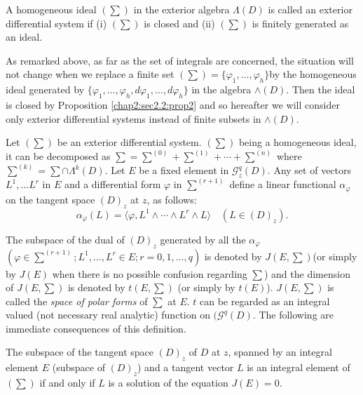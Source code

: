 \begin{defi*}%
  A homogeneous ideal $(\sum)$ in the exterior algebra $\Lambda(D)$ is
  called an exterior differential system if (i) $(\sum)$ is closed
  and (ii)  $(\sum)$ is finitely generated as an ideal. 
\end{defi*}

As remarked above,  as far as the set of integrals are concerned,  the
situation will not change when we replace a finite set  $(\sum) = \{
\varphi_1, \ldots,  \varphi_h\}$\pageoriginale by the homogeneous ideal generated by
$\{ \varphi_1,  \ldots,  \varphi_h,  d \varphi_1,  \ldots,  d
\varphi_h\}$ in the algebra $\wedge (D)$. Then the ideal is closed by
Proposition \ref{chap2:sec2.2:prop2} and so hereafter we will consider
only exterior 
differential systems instead of finite subsets in $\wedge (D)$. 

Let $(\sum)$ be an exterior differential system. $(\sum)$ being a
homogeneous ideal,  it can be decomposed as $\sum = \sum^{(0)} +
\sum^{(1)} + \cdots + \sum^{(n)}$ where $\sum^{(k)} = \sum \cap
\Lambda^k (D)$. Let $E$ be a fixed element in $\mathscr{G} ^{q}_z
(D)$. Any set of vectors $L^1,  \ldots L^r$ in $E$ and a differential
form $\varphi$ in $\sum^{(r +1)}$ define a linear functional
$\alpha_\varphi$ on the tangent space $(D)_z$ at $z$,  as follows: 
$$
\alpha_\varphi (L) = \langle \varphi,  L^1 \wedge \cdots \wedge L^r
\wedge L \rangle \quad (L \in (D)_z). 
$$

The subspace of the dual of $(D)_z$ generated by all the
$\alpha_\varphi$ \break $\left(\varphi \in \sum^{(r+1)}; L^1,  \ldots,
L^r  \in E; 
r = 0,  1,  \ldots,  q\right)$ is denoted by $J(E,  \sum)$\break (or simply by
$J(E)$ when there is no possible confusion regarding $\sum$) and the
dimension of $J(E,  \sum)$ is denoted by $t(E,  \sum)$ (or simply by
$t(E)$). $J(E,  \sum)$ is called the \textit{space of polar forms} of
$\sum$ at $E$. $t$ can be regarded as an integral valued (not
necessary real analytic) function on $(\mathscr{G}^q (D)$. The
following are immediate consequences of this definition. 

\begin{proposition}\label{chap2:sec2.2:prop3}%
  The subspace of the tangent space $(D)_z$ of $D$ at $z$,  spann\-ed by
  an integral element $E$ (subspace of $(D)_z$) and a tangent vector
  $L$ is an integral element of $(\sum)$ if and only if $L$ is a
  solution of the equation $J(E) = 0$. 
\end{proposition}

